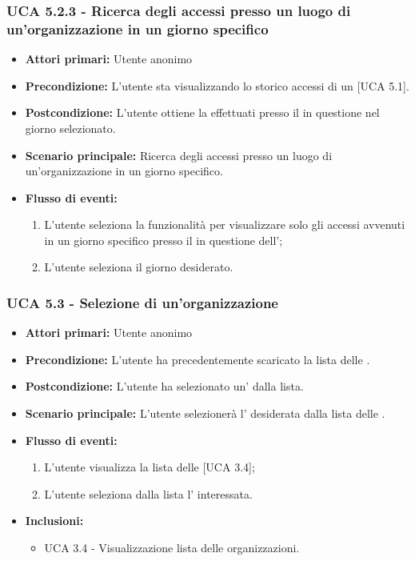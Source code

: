 \subsubsection{UCA 5.2.3 - Ricerca degli accessi presso un luogo di un'organizzazione in un giorno specifico}
\begin{itemize}
    \item \textbf{Attori primari:} Utente anonimo
    \item \textbf{Precondizione:} L'utente sta visualizzando lo storico accessi di un  [UCA 5.1].
    \item \textbf{Postcondizione:} L'utente ottiene la  effettuati presso il  in questione nel giorno selezionato.
    \item \textbf{Scenario principale:} Ricerca degli accessi presso un luogo di un'organizzazione in un giorno specifico.
    \item \textbf{Flusso di eventi:}
    \begin{enumerate}
        \item L'utente seleziona la funzionalità per visualizzare solo gli accessi avvenuti in un giorno specifico presso il  in questione dell';
        \item L'utente seleziona il giorno desiderato.
    \end{enumerate}
\end{itemize}

\subsubsection{UCA 5.3 - Selezione di un'organizzazione}
\begin{itemize}
    \item \textbf{Attori primari:} Utente anonimo
    \item \textbf{Precondizione:} L'utente ha precedentemente scaricato la lista delle .
    \item \textbf{Postcondizione:} L'utente ha selezionato un' dalla lista.
    \item \textbf{Scenario principale:} L'utente selezionerà l' desiderata dalla lista delle .
    \item \textbf{Flusso di eventi:}
    \begin{enumerate}
        \item L'utente visualizza la lista delle  [UCA 3.4];
        \item L'utente seleziona dalla lista l' interessata.
    \end{enumerate}
    \item \textbf{Inclusioni:}
    \begin{itemize}
        \item UCA 3.4 - Visualizzazione lista delle organizzazioni.
    \end{itemize}
\end{itemize}